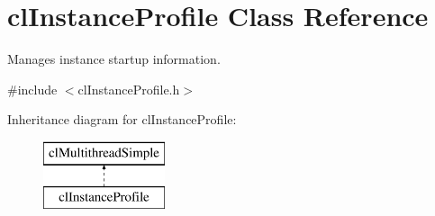 \hypertarget{classcl_instance_profile}{
\section{clInstanceProfile Class Reference}
\label{classcl_instance_profile}
}


Manages instance startup information.  




{\ttfamily \#include $<$clInstanceProfile.h$>$}

Inheritance diagram for clInstanceProfile:\begin{figure}[H]
\begin{center}
\leavevmode
\includegraphics[height=2.000000cm]{classcl_instance_profile}
\end{center}
\end{figure}
